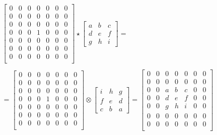 \begin{equation}
\begin{array}{l}
\begin{bmatrix}
    0 & 0 & 0 & 0 & 0 & 0 & 0 \\
    0 & 0 & 0 & 0 & 0 & 0 & 0 \\
    0 & 0 & 0 & 0 & 0 & 0 & 0 \\
    0 & 0 & 0 & 1 & 0 & 0 & 0 \\
    0 & 0 & 0 & 0 & 0 & 0 & 0 \\
    0 & 0 & 0 & 0 & 0 & 0 & 0 \\
    0 & 0 & 0 & 0 & 0 & 0 & 0 \\            
\end{bmatrix}
\star
\begin{bmatrix}
    a & b & c \\
    d & e & f \\
    g & h & i
\end{bmatrix}
= \\ \\
=
\begin{bmatrix}
    0 & 0 & 0 & 0 & 0 & 0 & 0 \\
    0 & 0 & 0 & 0 & 0 & 0 & 0 \\
    0 & 0 & 0 & 0 & 0 & 0 & 0 \\
    0 & 0 & 0 & 1 & 0 & 0 & 0 \\
    0 & 0 & 0 & 0 & 0 & 0 & 0 \\
    0 & 0 & 0 & 0 & 0 & 0 & 0 \\
    0 & 0 & 0 & 0 & 0 & 0 & 0 \\            
\end{bmatrix}
\otimes
\begin{bmatrix}
    i & h & g \\
    f & e & d \\
    c & b & a
\end{bmatrix}
=
\begin{bmatrix}
    0 & 0 & 0 & 0 & 0 & 0 & 0 \\
    0 & 0 & 0 & 0 & 0 & 0 & 0 \\
    0 & 0 & a & b & c & 0 & 0 \\
    0 & 0 & d & e & f & 0 & 0 \\
    0 & 0 & g & h & i & 0 & 0 \\
    0 & 0 & 0 & 0 & 0 & 0 & 0 \\
    0 & 0 & 0 & 0 & 0 & 0 & 0 \\            
\end{bmatrix}
\end{array}
\label{eq:convolution}
\end{equation}

